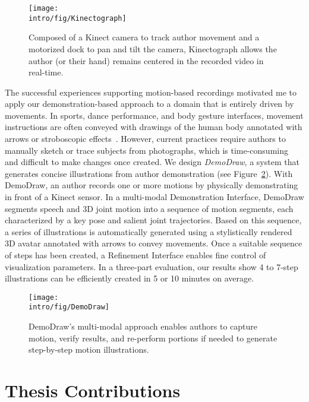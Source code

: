 \begin{figure}[!t]
  \centering
  \texttt{[image: \\intro/fig/Kinectograph]}
  \caption{Composed of a Kinect camera to track author movement and a motorized dock to pan and tilt the camera, Kinectograph allows the author (or their hand) remains centered in the recorded video in real-time.}
\label{fig:kinectograph_intro}
\end{figure}


The successful experiences supporting motion-based recordings motivated me to apply our demonstration-based approach to a domain that is entirely driven by movements. In sports, dance performance, and body gesture interfaces, movement instructions are often conveyed with drawings of the human body annotated with arrows or stroboscopic effects~\cite{cutting_representing_2002}. However, current practices require authors to manually sketch or trace subjects from photographs, which is time-consuming and difficult to make changes once created.
%
We design \emph{DemoDraw}, a system that generates concise illustrations from author demonstration (see Figure~\ref{fig:demodraw_intro}). With DemoDraw, an author records one or more motions by physically demonstrating in front of a Kinect sensor. In a multi-modal Demonstration Interface, DemoDraw segments speech and 3D joint motion into a sequence of motion segments, each characterized by a key pose and salient joint trajectories. Based on this sequence, a series of illustrations is automatically generated using a stylistically rendered 3D avatar annotated with arrows to convey movements. Once a suitable sequence of steps has been created, a Refinement Interface enables fine control of visualization parameters.
%
In a three-part evaluation, our results show 4 to 7-step illustrations can be efficiently created in 5 or 10 minutes on average.

\begin{figure}[t]
  \centering
  \texttt{[image: \\intro/fig/DemoDraw]}
  \caption{DemoDraw's multi-modal approach enables authors to capture motion, verify results, and re-perform portions if needed to generate step-by-step motion illustrations.}
  \label{fig:demodraw_intro}
\end{figure}


\section{Thesis Contributions}

